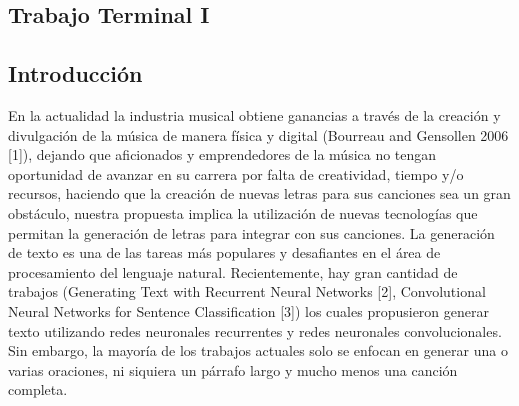 \documentclass[12pt, a4paper, titlepage]{report}
\begin{document}
	\begin{appendix}
		\renewcommand*\contentsname{{\textcolor{azulescom}{Índice.}}}
		\tableofcontents
		\newpage
		\renewcommand*\listfigurename{{\textcolor{azulescom}{Índice de figuras.}}}
		\listoffigures
		\newpage
		\newpage
		\renewcommand*\listtablename{{\textcolor{azulescom}{Índice de cuadros.}}}
		\listoftables
		
		\newpage
		\renewcommand*\glossaryname{{\textcolor{azulescom}{Glosario.}}}
		
		\printglossary
	\end{appendix}
	
   \textcolor{guindapoli}{\part{Trabajo Terminal I}}
    
    \renewcommand\thechapter{\arabic{chapter}}
    \renewcommand{\appendixname}{Capítulo}
    \renewcommand{\lstlistingname}{C\'odigo}
    \renewcommand{\thepart}{}
    \renewcommand{\partname}{}
    \chapter{\textcolor{azulescom}{Introducción}}
    
    En la actualidad la industria musical obtiene ganancias a través de la creación y divulgación de la música de
    manera física y digital (Bourreau and Gensollen 2006 [1]), dejando que aficionados y emprendedores de la
    música no tengan oportunidad de avanzar en su carrera por falta de creatividad, tiempo y/o recursos, haciendo que la creación de nuevas letras para sus canciones sea un gran obstáculo, nuestra propuesta implica la utilización de nuevas tecnologías que permitan la generación de letras para integrar con sus canciones. La generación de texto es una de las tareas más populares y desafiantes en el área de procesamiento del lenguaje natural. Recientemente, hay gran cantidad de trabajos (Generating Text with Recurrent Neural Networks [2], Convolutional Neural Networks for Sentence Classification [3]) los cuales propusieron generar texto utilizando redes neuronales recurrentes y redes neuronales convolucionales. Sin embargo, la mayoría de los trabajos actuales solo se enfocan en generar una o varias oraciones, ni siquiera un párrafo largo y mucho menos una canción completa.\par
    
\end{document}
